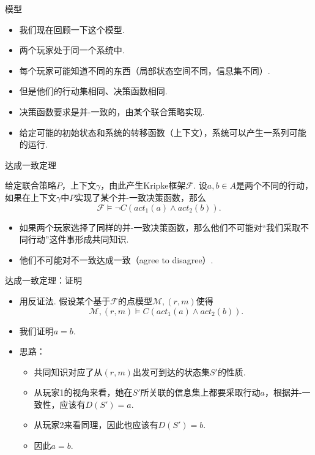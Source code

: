 \begin{frame}{模型}
\begin{itemize}
    \item 我们现在回顾一下这个模型.
    \item 两个玩家处于同一个系统中.
    \item 每个玩家可能知道不同的东西（局部状态空间不同，信息集不同）.
    \item 但是他们的行动集相同、决策函数相同.
    \item 决策函数要求是并-一致的，由某个联合策略实现.
    \item 给定可能的初始状态和系统的转移函数（上下文），系统可以产生一系列可能的运行.
\end{itemize}
\end{frame}

\begin{frame}{达成一致定理}
\begin{theorem}
给定联合策略$P$，上下文$\gamma$，由此产生Kripke框架$\mathcal F$. 设$a,b\in A$是两个不同的行动，如果在上下文$\gamma$中$P$实现了某个并-一致决策函数，那么
\[\mathcal F\vDash\neg C(act_1(a)\wedge act_2(b)).\]
\end{theorem}
\begin{itemize}
    \item 如果两个玩家选择了同样的并-一致决策函数，那么他们不可能对“我们采取不同行动”这件事形成共同知识.
    \item 他们不可能对不一致达成一致（agree to disagree）.
\end{itemize}
\end{frame}

\begin{frame}{达成一致定理：证明}
\begin{itemize}
    \item 用反证法. 假设某个基于$\mathcal F$的点模型$\mathcal M,(r,m)$使得
    \[\mathcal M,(r,m)\vDash C(act_1(a)\wedge act_2(b)).\]
    \item 我们证明$a=b$.
    \item 思路：
    \begin{itemize}
        \item 共同知识对应了从$(r,m)$出发可到达的状态集$S'$的性质.
        \item 从玩家1的视角来看，她在$S'$所关联的信息集上都要采取行动$a$，根据并-一致性，应该有$D(S')=a$.
        \item 从玩家2来看同理，因此也应该有$D(S')=b$.
        \item 因此$a=b$.
    \end{itemize}
\end{itemize}
\end{frame}

